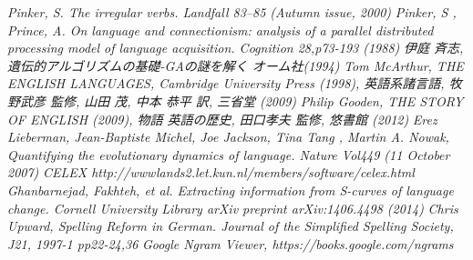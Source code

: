 \documentclass[10.5pt, a4j, twocolumn]{jsarticle}
\begin{document}
{\scriptsize
\begin{thebibliography}{9}
   \emph{Pinker, S. The irregular verbs. Landfall 83–85 (Autumn issue, 2000)}
   \emph{Pinker, S , Prince, A. On language and connectionism: analysis of a parallel distributed processing model of language acquisition. Cognition 28,p73-193 (1988)}
   \emph{伊庭 斉志, 遺伝的アルゴリズムの基礎-GAの謎を解く オーム社(1994)}
   \emph{Tom McArthur, THE ENGLISH LANGUAGES, Cambridge University Press (1998), 英語系諸言語, 牧野武彦 監修, 山田 茂, 中本 恭平 訳, 三省堂 (2009)}
   \emph{Philip Gooden, THE STORY OF ENGLISH (2009), 物語 英語の歴史, 田口孝夫 監修, 悠書館 (2012)}
    \emph{Erez Lieberman, Jean-Baptiste Michel, Joe Jackson, Tina Tang , Martin A. Nowak, Quantifying the evolutionary dynamics of language. Nature Vol449 (11 October 2007)}
    \emph{CELEX http://wwwlands2.let.kun.nl/members/software/celex.html}
    \emph{Ghanbarnejad, Fakhteh, et al. Extracting information from S-curves of language change. Cornell University Library arXiv preprint arXiv:1406.4498 (2014)}
    \emph{Chris Upward, Spelling Reform in German. Journal of the Simplified Spelling Society, J21, 1997-1 pp22-24,36}
    \emph{Google Ngram Viewer, https://books.google.com/ngrams}
\end{thebibliography}
}
\end{document}

